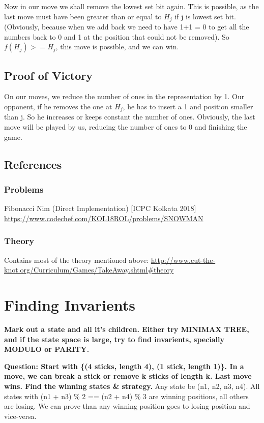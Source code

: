 Now in our move we shall remove the lowest set bit again. This is possible, as the last move must have been greater than or equal to $H_j$ if j is lowest set bit. (Obviously, because when we add back we need to have 1+1 = 0 to get all the numbers back to 0 and 1 at the position that could not be removed). So $f(H_j) >= H_j$, this move is possible, and we can win.

\subsection{Proof of Victory}
On our moves, we reduce the number of ones in the representation by 1. Our opponent, if he removes the one at $H_j$, he has to insert a 1 and position smaller than j. So he increases or keeps constant the number of ones. Obviously, the last move will be played by us, reducing the number of ones to 0 and finishing the game. 


\subsection{References}

\subsubsection{Problems}
Fibonacci Nim (Direct Implementation) [ICPC Kolkata 2018] \url{https://www.codechef.com/KOL18ROL/problems/SNOWMAN}

\subsubsection{Theory}
Contains most of the theory mentioned above: \url{http://www.cut-the-knot.org/Curriculum/Games/TakeAway.shtml#theory}



\section{Finding Invarients}

\textbf{Mark out a state and all it's children. Either try MINIMAX TREE, and if the state space is large, try to find invarients, specially MODULO or PARITY.}

\begin{example}{}
  \textbf{Question: Start with \{(4 sticks, length 4), (1 stick, length 1)\}. In a move, we can break a stick or remove k sticks of length k. Last move wins. Find the winning states \& strategy.}
  Any state be (n1, n2, n3, n4). All states with (n1 + n3) \% 2 == (n2 + n4) \% 3 are winning positions, all others are losing. We can prove than any winning position goes to losing position and vice-versa.
\end{example}
